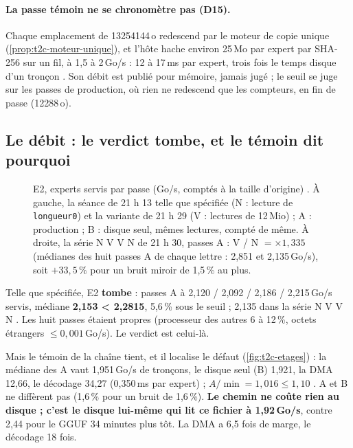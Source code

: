 \paragraph{La passe témoin ne se chronomètre pas (D15).} Chaque emplacement de \num{13254144}\,o redescend par le moteur de copie unique (\cref{prop:t2c-moteur-unique}), et l'hôte hache environ 25\,Mo par expert par SHA-256 sur un fil, à 1,5 à 2\,Go/s : 12 à 17\,ms par expert, trois fois le temps disque d'un tronçon \calc. Son débit est publié pour mémoire, jamais jugé ; le seuil se juge sur les passes de production, où rien ne redescend que les compteurs, en fin de passe (\num{12288}\,o).

\subsection{Le débit : le verdict tombe, et le témoin dit pourquoi}

\begin{figure}[ht]
\centering
\GrapheChmEdeux
\caption[E2 : experts servis par passe]{E2, experts servis par passe (Go/s, comptés à la taille d'origine) \mes. À gauche, la séance de 21 h 13 telle que spécifiée (N : lecture de \texttt{longueur0}) et la variante de 21 h 29 (V : lectures de 12\,Mio) ; A : production ; B : disque seul, mêmes lectures, compté de même. À droite, la série N V V N de 21 h 30, passes A : V / N $= \times 1{,}335$ (médianes des huit passes A de chaque lettre : 2,851 et 2,135\,Go/s), soit $+33{,}5\,\%$ pour un bruit miroir de 1,5\,\% au plus.}
\label{fig:t2c-e2}
\end{figure}

Telle que spécifiée, E2 \textbf{tombe} : passes A à 2,120 / 2,092 / 2,186 / 2,215\,Go/s servis, médiane \textbf{2,153 < 2,2815}, 5,6\,\% sous le seuil ; 2,135 dans la série N V V N \mes. Les huit passes étaient propres (processeur des autres 6 à 12\,\%, octets étrangers $\le 0{,}001$\,Go/s). Le verdict est celui-là.

Mais le témoin de la chaîne tient, et il localise le défaut (\cref{fig:t2c-etages}) : la médiane des A vaut 1,951\,Go/s de tronçons, le disque seul (B) 1,921, la DMA 12,66, le décodage 34,27 (0,350\,ms par expert) ; $A/\min = 1{,}016 \le 1{,}10$ \mes. A et B ne diffèrent pas (1,6\,\% pour un bruit de 1,6\,\%). \textbf{Le chemin ne coûte rien au disque ; c'est le disque lui-même qui lit ce fichier à 1,92\,Go/s}, contre 2,44 pour le GGUF 34 minutes plus tôt. La DMA a 6,5 fois de marge, le décodage 18 fois.

